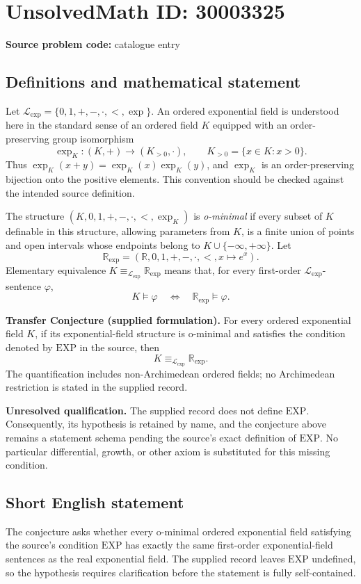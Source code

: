 \documentclass[11pt]{article}
\newcommand{\R}{\mathbb{R}}
\begin{document}
\section*{UnsolvedMath ID: 30003325}
\textbf{Source problem code:} catalogue entry
\subsection{Definitions and mathematical statement}
Let \(\mathcal L_{\exp}=\{0,1,+,-,\cdot,<,\exp\}\). An ordered exponential field is understood here in the standard sense of an ordered field \(K\) equipped with an order-preserving group isomorphism
\[
\exp_K:(K,+)\longrightarrow (K_{>0},\cdot),
\qquad K_{>0}=\{x\in K:x>0\}.
\]
Thus \(\exp_K(x+y)=\exp_K(x)\exp_K(y)\), and \(\exp_K\) is an order-preserving bijection onto the positive elements. This convention should be checked against the intended source definition.

The structure \((K,0,1,+,-,\cdot,<,\exp_K)\) is \emph{o-minimal} if every subset of \(K\) definable in this structure, allowing parameters from \(K\), is a finite union of points and open intervals whose endpoints belong to \(K\cup\{-\infty,+\infty\}\). Let
\[
\R_{\exp}=(\R,0,1,+,-,\cdot,<,x\mapsto e^x).
\]
Elementary equivalence \(K\equiv_{\mathcal L_{\exp}}\R_{\exp}\) means that, for every first-order \(\mathcal L_{\exp}\)-sentence \(\varphi\),
\[
K\models\varphi\quad\Longleftrightarrow\quad\R_{\exp}\models\varphi.
\]

\textbf{Transfer Conjecture (supplied formulation).} For every ordered exponential field \(K\), if its exponential-field structure is o-minimal and satisfies the condition denoted by \(\mathrm{EXP}\) in the source, then
\[
K\equiv_{\mathcal L_{\exp}}\R_{\exp}.
\]
The quantification includes non-Archimedean ordered fields; no Archimedean restriction is stated in the supplied record.

\textbf{Unresolved qualification.} The supplied record does not define \(\mathrm{EXP}\). Consequently, its hypothesis is retained by name, and the conjecture above remains a statement schema pending the source's exact definition of \(\mathrm{EXP}\). No particular differential, growth, or other axiom is substituted for this missing condition.
\subsection{Short English statement}
The conjecture asks whether every o-minimal ordered exponential field satisfying the source's condition \(\mathrm{EXP}\) has exactly the same first-order exponential-field sentences as the real exponential field. The supplied record leaves \(\mathrm{EXP}\) undefined, so the hypothesis requires clarification before the statement is fully self-contained.
\end{document}
